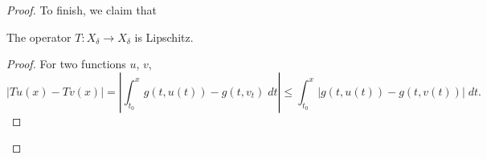 \documentclass[10pt]{scrartcl}
\providecommand{\abs}[1]{\left|{#1}\right|}
\providecommand{\dif}{\;d}
\begin{document}
\begin{proof}
	To finish, we claim that
	\begin{claim}
		The operator $T\colon X_\delta\to X_\delta$ is Lipschitz.
	\end{claim}
	\begin{proof}
		For two functions $u$, $v$,
		\[|Tu(x) - Tv(x)| = \abs{\int_{t_0}^x g(t, u(t)) - g(t, v_t)\dif t}
		\le \int_{t_0}^x |g(t, u(t)) - g(t, v(t))|\dif t.\]
	\end{proof}
\end{proof}
\end{document}
